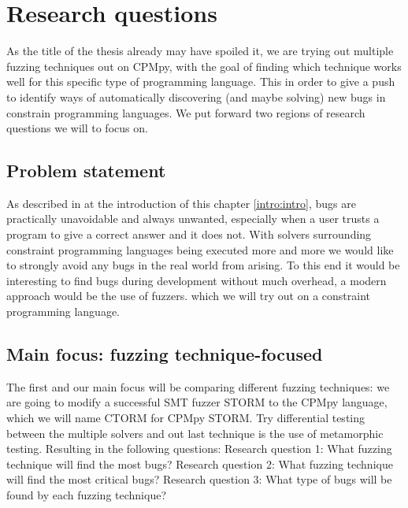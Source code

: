 \section{Research questions}
\label{intro:RQ:RQ's}
As the title of the thesis already may have spoiled it, we are trying out multiple fuzzing techniques out on CPMpy, with the goal of finding which technique works well for this specific type of programming language. This in order to give a push to identify ways of automatically discovering (and maybe solving) new bugs in constrain programming languages. We put forward two regions of research questions we will to focus on.

\subsection{Problem statement}
\label{intro:ProblemStatment}
As described in at the introduction of  this chapter \ref{intro:intro}, bugs are practically unavoidable and always unwanted, especially when a user trusts a program to give a correct answer and it does not. With solvers surrounding constraint programming languages being executed more and more we would like to strongly avoid any bugs in the real world from arising. To this end it would be interesting to find bugs during development without much overhead, a modern approach would be the use of fuzzers. which we will try out on a constraint programming language.

\subsection{Main focus: fuzzing technique-focused}
\label{intro:RQ:MainFocus}
The first and our main focus will be comparing different fuzzing techniques: we are going to modify a successful SMT fuzzer STORM to the CPMpy language, which we will name CTORM for CPMpy STORM. Try differential testing between the multiple solvers and out last technique is the use of metamorphic testing. Resulting in the following questions: \newline
Research question 1: What fuzzing technique will find the most bugs? \newline 
Research question 2: What fuzzing technique will find the most critical bugs? \newline
Research question 3: What type of bugs will be found by each fuzzing technique? \newline

